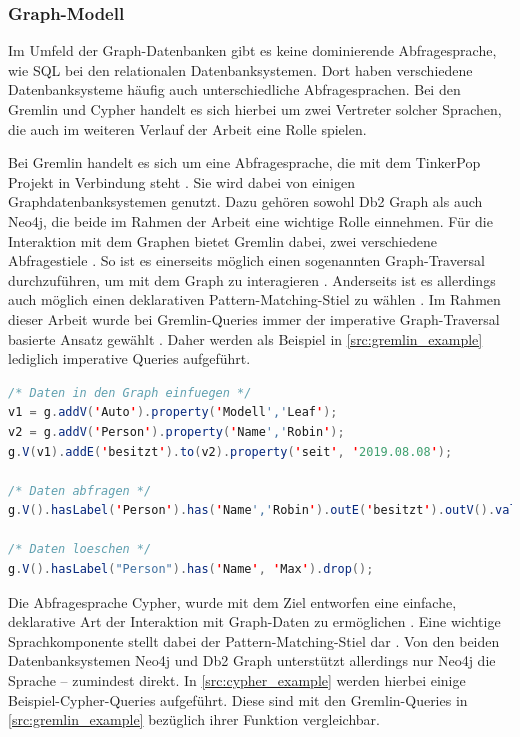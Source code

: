 \subsubsection{Graph-Modell}

Im Umfeld der Graph-Datenbanken gibt es keine dominierende Abfragesprache, wie SQL bei den relationalen Datenbanksystemen. Dort haben verschiedene Datenbanksysteme häufig auch unterschiedliche Abfragesprachen. Bei den  Gremlin und Cypher handelt es sich hierbei um zwei Vertreter solcher Sprachen, die auch im weiteren Verlauf der Arbeit eine Rolle spielen. 

Bei Gremlin handelt es sich um eine Abfragesprache, die mit dem TinkerPop Projekt in Verbindung steht \cite{tinkerpop_2020}. Sie wird dabei von einigen Graphdatenbanksystemen genutzt. Dazu gehören sowohl Db2 Graph als auch Neo4j, die beide im Rahmen der Arbeit eine wichtige Rolle einnehmen. Für die Interaktion mit dem Graphen bietet Gremlin dabei, zwei verschiedene Abfragestiele \cite{gremlin_paper}. So ist es einerseits möglich einen sogenannten Graph-Traversal durchzuführen, um mit dem Graph zu interagieren \cite{gremlin_paper}. Anderseits ist es allerdings auch möglich einen deklarativen Pattern-Matching-Stiel zu wählen \cite{gremlin_paper}. Im Rahmen dieser Arbeit wurde bei Gremlin-Queries immer der imperative Graph-Traversal basierte Ansatz gewählt \cite{gremlin_paper}. Daher werden als Beispiel in \autoref{src:gremlin_example} lediglich imperative Queries aufgeführt. 

\begin{lstlisting}[caption={Beispiel Gremlin-Queries},language=JAVA,label=src:gremlin_example]
/* Daten in den Graph einfuegen */
v1 = g.addV('Auto').property('Modell','Leaf');
v2 = g.addV('Person').property('Name','Robin');
g.V(v1).addE('besitzt').to(v2).property('seit', '2019.08.08');

/* Daten abfragen */
g.V().hasLabel('Person').has('Name','Robin').outE('besitzt').outV().values('Modell')

/* Daten loeschen */
g.V().hasLabel("Person").has('Name', 'Max').drop();
\end{lstlisting}

Die Abfragesprache Cypher, wurde mit dem Ziel entworfen eine einfache, deklarative Art der Interaktion mit Graph-Daten zu ermöglichen \cite{gdbms}. Eine wichtige Sprachkomponente stellt dabei der Pattern-Matching-Stiel dar \cite{gdbms}. Von den beiden Datenbanksystemen Neo4j und Db2 Graph unterstützt allerdings nur Neo4j die Sprache -- zumindest direkt. In \autoref{src:cypher_example} werden hierbei einige Beispiel-Cypher-Queries aufgeführt. Diese sind mit den Gremlin-Queries in \autoref{src:gremlin_example} bezüglich ihrer Funktion vergleichbar. 

